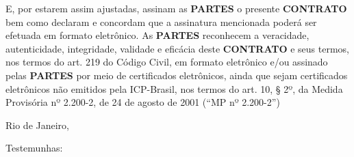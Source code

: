 E, por estarem assim ajustadas, assinam as \textbf{PARTES} o presente \textbf{CONTRATO} bem como declaram e concordam que a assinatura mencionada poderá ser efetuada em formato eletrônico. As \textbf{PARTES} reconhecem a veracidade, autenticidade, integridade, validade e eficácia deste \textbf{CONTRATO} e seus termos, nos termos do art. 219 do Código Civil, em formato eletrônico e/ou assinado pelas \textbf{PARTES} por meio de certificados eletrônicos, ainda que sejam certificados eletrônicos não emitidos pela ICP-Brasil, nos termos do art. 10, § 2º, da Medida Provisória nº 2.200-2, de 24 de agosto de 2001 (“MP nº 2.200-2”)

\begin{flushright}
  Rio de Janeiro, \DataCompletaCelebracao 
\end{flushright}



\begin{center}
  \begingroup
  \endgroup
  
  \begingroup
  \endgroup
  
  
\end{center}


\begingroup
\centering
{}
\hspace{1.7cm}

\endgroup

Testemunhas:

\begingroup
  \centering
  \hspace{1.7cm}
 \par
\endgroup